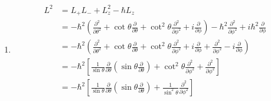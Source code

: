 \documentclass{article}
\begin{document}
\begin{enumerate}
  \item

        \begin{align*}
          L^2 & = L_+ L_- + L_z^2 - \hbar L_z                                                                                                                                                                                                                                                               \\
              & = -\hbar^2 \left( \frac{\partial^2}{\partial \theta^2} + \cot \theta \frac{\partial}{\partial \theta} + \cot^2 \theta \frac{\partial^2}{\partial \phi^2} + i \frac{\partial}{\partial \phi} \right) - \hbar^2 \frac{\partial^2}{\partial \phi^2} + i \hbar^2 \frac{\partial}{\partial \phi} \\
              & = -\hbar^2 \left( \frac{\partial^2}{\partial \theta^2} + \cot \theta \frac{\partial}{\partial \theta} + \cot^2 \theta \frac{\partial^2}{\partial \phi^2} + i \frac{\partial}{\partial \phi} + \frac{\partial^2}{\partial \phi^2} - i \frac{\partial}{\partial \phi} \right)                 \\
              & = -\hbar^2 \left[ \frac{1}{\sin \theta} \frac{\partial}{\partial \theta} \left( \sin \theta \frac{\partial}{\partial \theta} \right) + \cot^2 \theta \frac{\partial^2}{\partial \phi^2} + \frac{\partial^2}{\partial \phi^2} \right]                                                        \\
              & = -\hbar^2 \left[ \frac{1}{\sin \theta} \frac{\partial}{\partial \theta} \left( \sin \theta \frac{\partial}{\partial \theta} \right) + \frac{1}{\sin^2 \theta} \frac{\partial^2}{\partial \phi^2} \right]
        \end{align*}
\end{enumerate}

\subsection{}
\end{document}
